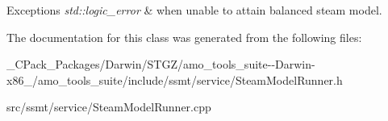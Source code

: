 \begin{DoxyExceptions}{Exceptions}
{\em std\+::logic\+\_\+error} & when unable to attain balanced steam model. \\
\hline
\end{DoxyExceptions}


The documentation for this class was generated from the following files\+:\begin{DoxyCompactItemize}
\item 
\+\_\+\+C\+Pack\+\_\+\+Packages/\+Darwin/\+S\+T\+G\+Z/amo\+\_\+tools\+\_\+suite-\/-\/\+Darwin-\/x86\+\_/amo\+\_\+tools\+\_\+suite/include/ssmt/service/Steam\+Model\+Runner.\+h\item 
src/ssmt/service/Steam\+Model\+Runner.\+cpp\end{DoxyCompactItemize}
